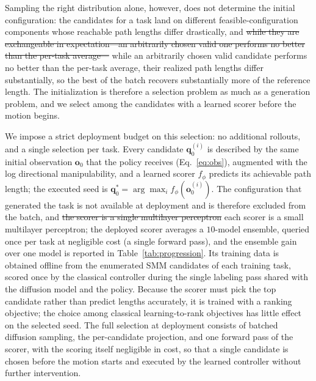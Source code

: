 \documentclass[journal, twoside]{IEEEtran}
\newcommand{\rev}[1]{\begingroup\color{magenta}#1\endgroup}
\newcommand{\rst}[1]{{\color{rstcolor}#1}}
\begin{document}
\rev{Sampling the right distribution alone, however, does not determine the initial configuration: the candidates for a task land on different feasible-configuration components whose reachable path lengths differ drastically, and \sout{while they are exchangeable in expectation---an arbitrarily chosen valid one performs no better than the per-task average---} \rst{while an arbitrarily chosen valid candidate performs no better than the per-task average, their realized path lengths differ substantially, so} the best of the batch recovers substantially more of the reference length. The initialization is therefore a selection problem as much as a generation problem, and we select among the candidates with a learned scorer before the motion begins.}

\rev{We impose a strict deployment budget on this selection: no additional rollouts, and a single selection per task. Every candidate $\mathbf{q}_{0}^{(i)}$ is described by the same initial observation $\mathbf{o}_{0}$ that the policy receives (Eq.~\eqref{eq:obs}), augmented with the log directional manipulability, and a learned scorer $f_{\phi}$ predicts its achievable path length; the executed seed is $\mathbf{q}_{0}^{*}=\arg\max_{i} f_{\phi}(\mathbf{o}_{0}^{(i)})$. The configuration that generated the task is not available at deployment and is therefore excluded from the batch, and \sout{the scorer is a single multilayer perceptron} \rst{each scorer is a small multilayer perceptron; the deployed scorer averages a $10$-model ensemble, queried once per task at negligible cost (a single forward pass), and the ensemble gain over one model is reported in Table~\ref{tab:progression}}. Its training data is obtained offline from the enumerated SMM candidates of each training task, scored once by the classical controller during the single labeling pass shared with the diffusion model and the policy. Because the scorer must pick the top candidate rather than predict lengths accurately, it is trained with a ranking objective; the choice among classical learning-to-rank objectives has little effect on the selected seed. The full selection at deployment consists of batched diffusion sampling, the per-candidate projection, and one forward pass of the scorer, with the scoring itself negligible in cost, so that a single candidate is chosen before the motion starts and executed by the learned controller without further intervention.}



\end{document}
